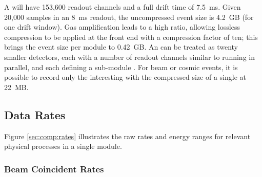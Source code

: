 

A  will have 153,600 readout channels and a full drift time of \SI{7.5}{ms}. Given 20,000 samples in an \SI{8}{ms} readout, the uncompressed event size is \SI{4.2}{GB} (for one drift window).  Gas amplification leads to a high  ratio, allowing lossless compression to be applied at the front end  with a compression factor of ten; this brings the event size per module to \SI{.42}{GB}.
An    can be treated as twenty smaller  detectors, each with a number of readout channels similar to   %
running in parallel,  and each defining a sub-module . For beam or cosmic events, it is possible to record only the interesting  with the compressed size of a single  at \SI{22}{MB}.

\subsection{Data Rates}
\label{sec:exec-comp-dt-dr}

Figure \ref{sec:comp:rates} illustrates the raw rates and energy ranges for relevant physical processes in a single   module. 


\subsubsection{Beam Coincident Rates}
\label{sec:exec-comp-dt-bcr}

